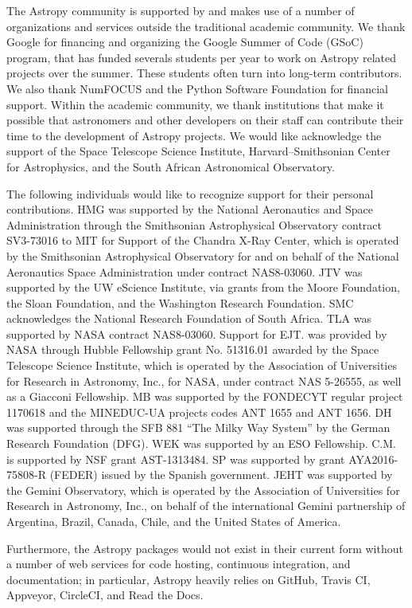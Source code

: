 \documentclass[modern]{aastex62}
\newcommand{\astropy}{Astropy\xspace}
\begin{document}
The \astropy community is supported by and makes use
of a number of organizations and services outside the traditional
academic community. We thank Google for financing and organizing the
Google Summer of Code (GSoC) program, that has funded severals
students per year to work on \astropy related projects over the
summer. These students often turn into long-term contributors. We also
thank NumFOCUS and the Python Software Foundation for financial
support. Within the academic community, we thank
institutions that make it possible that astronomers and other developers on
their staff can contribute their time to the development of
\astropy projects.  We would like acknowledge the support of the
Space Telescope Science Institute, Harvard–Smithsonian Center for Astrophysics,
and the South African Astronomical Observatory.

The following individuals would like to recognize support for their personal contributions.
HMG was supported by the National Aeronautics and Space Administration through the
Smithsonian Astrophysical Observatory contract SV3-73016 to MIT for Support of the Chandra X-Ray Center, which is
operated by the Smithsonian Astrophysical Observatory for and on behalf of the National Aeronautics Space
Administration under contract NAS8-03060. JTV was supported by the UW eScience Institute, via grants from the Moore
Foundation, the Sloan Foundation, and the Washington Research Foundation. SMC acknowledges the National Research
Foundation of South Africa. TLA was supported by NASA contract NAS8-03060. Support for EJT. was provided by NASA
through Hubble Fellowship grant No. 51316.01 awarded by the Space Telescope Science Institute, which is operated by
the Association of Universities for Research in Astronomy, Inc., for NASA, under contract NAS 5-26555, as well as a
Giacconi Fellowship. MB was supported by the FONDECYT regular project 1170618 and the MINEDUC-UA projects codes
ANT 1655 and ANT 1656. DH was supported through the SFB 881 ``The Milky Way System'' by the German Research Foundation
(DFG). WEK was supported by an ESO Fellowship. C.M. is supported by NSF grant AST-1313484. SP was supported by
grant AYA2016-75808-R (FEDER) issued by the Spanish government. JEHT was supported by the Gemini Observatory, which
is operated by the Association of Universities for Research in Astronomy, Inc., on behalf of the international
Gemini partnership of Argentina, Brazil, Canada, Chile, and the United States of America.


Furthermore, the \astropy packages would not exist
in their current form without a number of web services for code
hosting, continuous integration, and documentation; in particular,
\astropy heavily relies on GitHub, Travis CI, Appveyor, CircleCI, and
Read the Docs.
\end{document}
